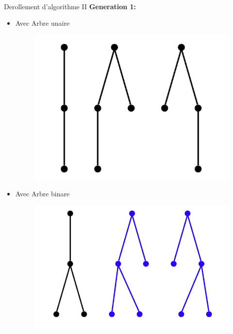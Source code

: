 \documentclass{beamer}
\begin{document}
\begin{frame}{Derollement d'algorithme II}
\textbf{Generation 1:}\\
\begin{itemize}
\item  Avec Arbre unaire
\begin{figure}[h]
  \centering
  \includegraphics[scale=0.17]{gen1-1.png}
\end{figure}
\item Avec Arbre binare
\begin{figure}[h]
  \centering
  \includegraphics[scale=0.17]{gen1-2.png}
\end{figure}
\end{itemize}
\end{frame}
\end{document}
